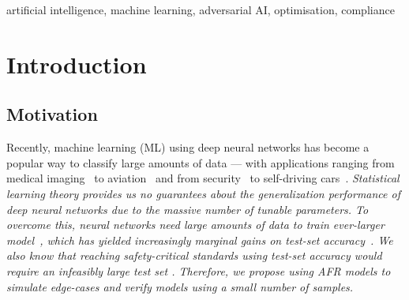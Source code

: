 \documentclass[conference]{IEEEtran}
\newcommand{\cm}[1]{\textit{{\color{blue}#1}}}
\begin{document}
\begin{IEEEkeywords}
artificial intelligence, machine learning, adversarial AI, optimisation, compliance
\end{IEEEkeywords}


\section{Introduction}
\subsection{Motivation}

Recently, machine learning (ML) using deep neural networks has become a popular way to classify large amounts of data --- with applications ranging from medical imaging~\cite{ai_medical_imaging} to aviation~\cite{ai_aviation} and from security~\cite{ai_security,ai_luggage,ai_prison} to self-driving cars~\cite{ai_automotive}. 
\cm{Statistical learning theory \cite{vcdimension} provides us no guarantees about the generalization performance of deep neural networks due to the massive number of tunable parameters. To overcome this, neural networks need large amounts of data\cite{desislavov2021compute,bailly2022effects} to train ever-larger model~\cite{desislavov2021compute}, which has  yielded increasingly marginal gains on test-set accuracy~\cite{sun2017revisiting}. We also know that  reaching safety-critical standards using test-set accuracy would require an infeasibly large test set \cite{meyers}. Therefore, we propose using AFR models to simulate edge-cases and verify models using a small number of samples.}







 
\end{document}
